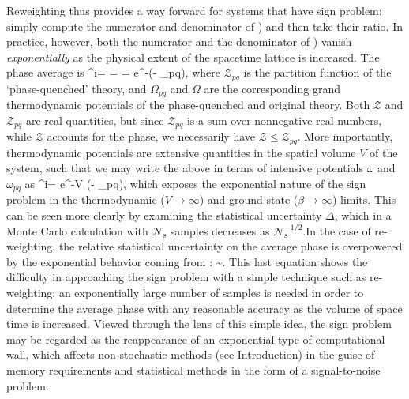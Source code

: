 \documentclass[../main.tex]{subfiles}
\begin{document}
Reweighting thus provides a way forward for systems that have sign problem: simply compute the numerator and
denominator of ) and then take their ratio. In practice, however,
both the numerator and the denominator of ) vanish {\it exponentially}
as the physical extent of the spacetime lattice is increased. The phase average is
%
\beq
\langle{}^{i\theta[\phi]}\rangle\rangle =
 =  = {\rm e}^{-\beta(\Omega - \Omega_{pq})},
\eeq
%
where ${\mathcal Z}_{pq}$ is the partition function of the `phase-quenched' theory, and $\Omega_{pq}$ and $\Omega$ are the corresponding grand thermodynamic potentials of the phase-quenched and original theory. Both $\mathcal Z$ and ${{\mathcal Z}_{pq}}$ are real quantities, but since ${\mathcal Z}_{pq}$ is a sum over nonnegative real numbers, while ${\mathcal Z}$ accounts for the phase, we necessarily have ${\mathcal Z} \leq {{\mathcal Z}_{pq}}$.
More importantly, thermodynamic potentials are extensive quantities in the spatial volume $V$ of the system, such that we may write the above in terms of intensive potentials $\omega$ and $\omega_{pq}$ as
%
\beq
\label{Eq:PhaseAvg}
\langle{}^{i\theta[\phi]}\rangle\rangle = {\rm e}^{-\beta V (\omega - \omega_{pq})},
\eeq
%
which exposes the exponential nature of the sign problem in the thermodynamic ($V \to \infty$) and ground-state ($\beta \to \infty$) limits.
This can be seen more clearly by examining the statistical uncertainty $\Delta$, which in a Monte Carlo calculation with ${\mathcal N}_\mathrm{s}$ samples decreases as
${\mathcal N}_\mathrm{s}^{-1/2}$.In the case of re-weighting, the relative statistical uncertainty on the average phase is overpowered by the exponential
behavior coming from :
%
\beq
{} \sim {}.
\eeq
%
This last equation shows the difficulty in approaching the sign problem with a simple technique such as re-weighting: an exponentially
large number of samples is needed in order to determine the average phase with any reasonable accuracy as the volume of space time
is increased. Viewed through the lens of this simple idea, the sign problem may be regarded as the reappearance of an exponential type
of computational wall, which affects non-stochastic methods (see Introduction) in the guise of memory requirements and statistical methods
in the form of a signal-to-noise problem.
\end{document}
